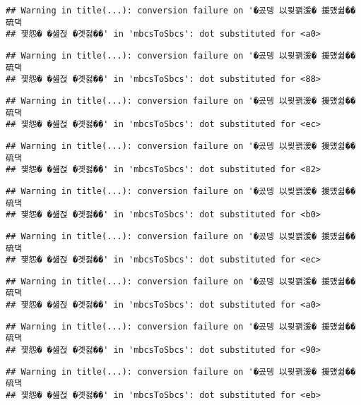 \documentclass[
]{article}
\begin{document}
\begin{verbatim}
## Warning in title(...): conversion failure on '�곴뎅 以묒꽭湲� 援먰쉶�� 硫댁
## 쟻怨� �섎젅 �곗젏��' in 'mbcsToSbcs': dot substituted for <a0>
\end{verbatim}

\begin{verbatim}
## Warning in title(...): conversion failure on '�곴뎅 以묒꽭湲� 援먰쉶�� 硫댁
## 쟻怨� �섎젅 �곗젏��' in 'mbcsToSbcs': dot substituted for <88>
\end{verbatim}

\begin{verbatim}
## Warning in title(...): conversion failure on '�곴뎅 以묒꽭湲� 援먰쉶�� 硫댁
## 쟻怨� �섎젅 �곗젏��' in 'mbcsToSbcs': dot substituted for <ec>
\end{verbatim}

\begin{verbatim}
## Warning in title(...): conversion failure on '�곴뎅 以묒꽭湲� 援먰쉶�� 硫댁
## 쟻怨� �섎젅 �곗젏��' in 'mbcsToSbcs': dot substituted for <82>
\end{verbatim}

\begin{verbatim}
## Warning in title(...): conversion failure on '�곴뎅 以묒꽭湲� 援먰쉶�� 硫댁
## 쟻怨� �섎젅 �곗젏��' in 'mbcsToSbcs': dot substituted for <b0>
\end{verbatim}

\begin{verbatim}
## Warning in title(...): conversion failure on '�곴뎅 以묒꽭湲� 援먰쉶�� 硫댁
## 쟻怨� �섎젅 �곗젏��' in 'mbcsToSbcs': dot substituted for <ec>
\end{verbatim}

\begin{verbatim}
## Warning in title(...): conversion failure on '�곴뎅 以묒꽭湲� 援먰쉶�� 硫댁
## 쟻怨� �섎젅 �곗젏��' in 'mbcsToSbcs': dot substituted for <a0>
\end{verbatim}

\begin{verbatim}
## Warning in title(...): conversion failure on '�곴뎅 以묒꽭湲� 援먰쉶�� 硫댁
## 쟻怨� �섎젅 �곗젏��' in 'mbcsToSbcs': dot substituted for <90>
\end{verbatim}

\begin{verbatim}
## Warning in title(...): conversion failure on '�곴뎅 以묒꽭湲� 援먰쉶�� 硫댁
## 쟻怨� �섎젅 �곗젏��' in 'mbcsToSbcs': dot substituted for <eb>
\end{verbatim}
\end{document}
